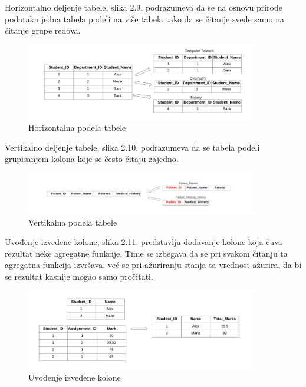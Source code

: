 \documentclass[12pt,oneside]{memoir}
\begin{document}
Horizontalno deljenje tabele, slika 2.9. podrazumeva da se na osnovu prirode podataka jedna tabela podeli na više tabela tako da se čitanje svede samo na čitanje grupe redova. 

\begin{figure}[!ht]
  \centering
  \includegraphics[width=0.9\textwidth]{denormalizacija2.png}
  \caption{Horizontalna podela tabele}
  \label{fig:grafikon}
\end{figure}

Vertikalno deljenje tabele, slika 2.10. podrazumeva da se tabela podeli grupisanjem kolona koje se često čitaju zajedno. 

\begin{figure}[!ht]
  \centering
  \includegraphics[width=0.9\textwidth]{denormalizacija3.png}
  \caption{Vertikalna podela tabele}
  \label{fig:grafikon}
\end{figure}

Uvođenje izvedene kolone, slika 2.11. predstavlja dodavanje kolone koja čuva rezultat neke agregatne funkcije. Time se izbegava da se pri svakom čitanju ta agregatna funkcija izvršava, već se pri ažuriranju stanja ta vrednost ažurira, da bi se rezultat kasnije mogao samo pročitati.



\begin{figure}[!ht]
  \centering
  \includegraphics[width=0.9\textwidth]{denormalizacija4.png}
  \caption{Uvođenje izvedene kolone}
  \label{fig:grafikon}
\end{figure}
\pagebreak
\end{document}
